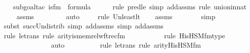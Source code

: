 \begin{isabellebody}
\ \ \isamarkupfalse%
{\isacharparenleft}{\kern0pt}subgoal{\isacharunderscore}{\kern0pt}tac\ {\isachardoublequoteopen}is{\isacharunderscore}{\kern0pt}{}{\isacharunderscore}{\kern0pt}fm{\isacharparenleft}{\kern0pt}{}{\isacharparenright}{\kern0pt}\ {\isasymin}\ formula{\isachardoublequoteclose}{\isacharparenright}{\kern0pt}\ \isanewline
\ \ \ \ \isamarkupfalse%
{\isacharparenleft}{\kern0pt}rule\ pred{\isacharunderscore}{\kern0pt}le{\isacharcomma}{\kern0pt}\ simp\ add{\isacharcolon}{\kern0pt}assms{\isacharcomma}{\kern0pt}\ rule\ union{\isacharunderscore}{\kern0pt}in{\isacharunderscore}{\kern0pt}nat{\isacharparenright}{\kern0pt}\isanewline
\ \ \isamarkupfalse%
\ assms\ \isanewline
\ \ \ \ \ \ \isamarkupfalse%
\ auto{\isacharbrackleft}{\kern0pt}{}{\isacharbrackright}{\kern0pt}\isanewline
\ \ \ \ \isamarkupfalse%
{\isacharparenleft}{\kern0pt}rule\ Un{\isacharunderscore}{\kern0pt}least{\isacharunderscore}{\kern0pt}lt{\isacharparenright}{\kern0pt}\isanewline
\ \ \isamarkupfalse%
\ assms\ \isanewline
\ \ \ \ \ \isamarkupfalse%
\ simp\isanewline
\ \ \ \ \ \isamarkupfalse%
{\isacharparenleft}{\kern0pt}subst\ succ{\isacharunderscore}{\kern0pt}Un{\isacharunderscore}{\kern0pt}distrib{\isacharcomma}{\kern0pt}\ simp\ add{\isacharcolon}{\kern0pt}assms{\isacharcomma}{\kern0pt}\ simp\ add{\isacharcolon}{\kern0pt}assms{\isacharparenright}{\kern0pt}\isanewline
\ \ \ \ \ \isamarkupfalse%
{\isacharparenleft}{\kern0pt}rule\ le{\isacharunderscore}{\kern0pt}trans{\isacharcomma}{\kern0pt}\ rule\ arity{\isacharunderscore}{\kern0pt}is{\isacharunderscore}{\kern0pt}memrel{\isacharunderscore}{\kern0pt}wftrec{\isacharunderscore}{\kern0pt}fm{\isacharparenright}{\kern0pt}\isanewline
\ \ \ \ \ \ \ \ \ \ \isamarkupfalse%
{\isacharparenleft}{\kern0pt}rule\ His{\isacharunderscore}{\kern0pt}HS{\isacharunderscore}{\kern0pt}M{\isacharunderscore}{\kern0pt}fm{\isacharunderscore}{\kern0pt}type{\isacharparenright}{\kern0pt}\isanewline
\ \ \ \ \ \ \ \ \ \ \ \ \isamarkupfalse%
\ auto{\isacharbrackleft}{\kern0pt}{}{\isacharbrackright}{\kern0pt}\isanewline
\ \ \ \ \ \ \ \ \ \isamarkupfalse%
{\isacharparenleft}{\kern0pt}rule\ le{\isacharunderscore}{\kern0pt}trans{\isacharcomma}{\kern0pt}\ rule\ arity{\isacharunderscore}{\kern0pt}His{\isacharunderscore}{\kern0pt}HS{\isacharunderscore}{\kern0pt}M{\isacharunderscore}{\kern0pt}fm{\isacharparenright}{\kern0pt}\isanewline

\end{isabellebody}

